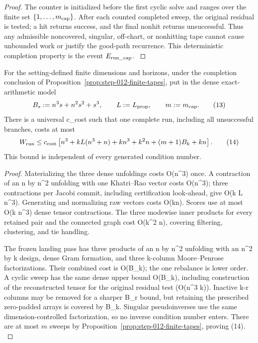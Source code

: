 \begin{proposition}
\begin{proof}
The counter is initialized before the first cyclic solve and ranges over the
finite set \(\{1,\ldots,m_{\rm cap}\}\). After each counted completed sweep,
the original residual is tested; a hit returns success, and the final nonhit
returns unsuccessful. Thus any admissible noncovered, singular, off-chart,
or nonhitting tape cannot cause unbounded work or justify the good-path
recurrence. This deterministic completion property is the event
\(E_{\rm run\_cap}\).
\(\)


\end{proof}
\end{proposition}
\begin{proposition}\label{prop:step-012-dense-cost}
For the setting-defined finite dimensions and horizons, under the completion
conclusion of Proposition~\ref{prop:step-012-finite-tapes}, put in the dense
exact-arithmetic model
\[
 B_s:=n^3s+n^2s^2+s^3,\qquad
 L:=L_{\rm prop},\qquad m:=m_{\rm cap}.
\tag{13}
\]
There is a universal c\_cost such that one complete run, including all
unsuccessful branches, costs at most
\[
 W_{\rm run}\le c_{\rm cost}\left[
 n^3+kL(n^3+n)+kn^3+k^2n+(m+1)B_k+kn\right].
\tag{14}
\]
This bound is independent of every generated condition number.

\begin{proof}
Materializing the three dense unfoldings costs
O(n\textasciicircum{}3) once. A contraction of an n by n\textasciicircum{}2 unfolding with one Khatri--Rao
vector costs O(n\textasciicircum{}3); three contractions per Jacobi commit, including
certification look-ahead, give O(k L n\textasciicircum{}3). Generating and normalizing raw
vectors costs O(kn). Scores use at most O(k n\textasciicircum{}3) dense tensor contractions.
The three modewise inner products for every retained pair and the connected
graph cost O(k\textasciicircum{}2 n), covering filtering, clustering, and tie handling.

The frozen landing pass has three products of an n by n\textasciicircum{}2 unfolding with an
n\textasciicircum{}2 by k design, dense Gram formation, and three k-column Moore--Penrose
factorizations. Their
combined cost is O(B\_k); the one rebalance is lower order. A cyclic sweep has
the same dense upper bound O(B\_k), including construction of the reconstructed
tensor for the original residual test (O(n\textasciicircum{}3 k)). Inactive k-r columns may
be removed for a sharper B\_r bound, but retaining the prescribed zero-padded
arrays is covered by B\_k. Singular pseudoinverses use the same
dimension-controlled factorization, so no inverse condition number enters.
There are at most \(m\) sweeps by
Proposition~\ref{prop:step-012-finite-tapes}, proving (14).
\(\)


\end{proof}
\end{proposition}
